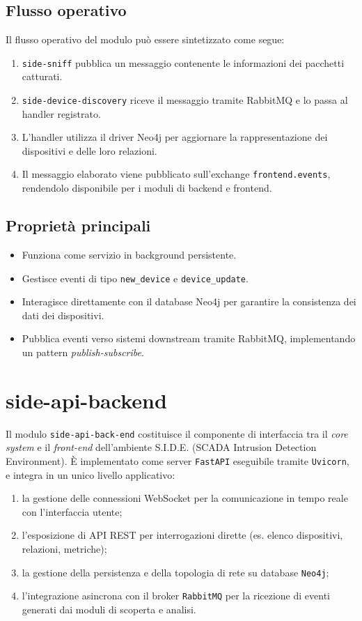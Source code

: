 \subsection{Flusso operativo}

Il flusso operativo del modulo può essere sintetizzato come segue:

\begin{enumerate}
    \item \texttt{side-sniff} pubblica un messaggio contenente le informazioni dei pacchetti catturati.
    \item \texttt{side-device-discovery} riceve il messaggio tramite RabbitMQ e lo passa al handler registrato.
    \item L'handler utilizza il driver Neo4j per aggiornare la rappresentazione dei dispositivi e delle loro relazioni.
    \item Il messaggio elaborato viene pubblicato sull'exchange \texttt{frontend.events}, rendendolo disponibile per i moduli di backend e frontend.
\end{enumerate}

\subsection{Proprietà principali}

\begin{itemize}
    \item Funziona come servizio in background persistente.
    \item Gestisce eventi di tipo \texttt{new\_device} e \texttt{device\_update}.
    \item Interagisce direttamente con il database Neo4j per garantire la consistenza dei dati dei dispositivi.
    \item Pubblica eventi verso sistemi downstream tramite RabbitMQ, implementando un pattern \textit{publish-subscribe}.
\end{itemize}


\section{side-api-backend}

Il modulo \texttt{side-api-back-end} costituisce il componente di interfaccia tra il \textit{core system} e il \textit{front-end} dell’ambiente S.I.D.E. (SCADA Intrusion Detection Environment).  
È implementato come server \texttt{FastAPI} eseguibile tramite \texttt{Uvicorn}, e integra in un unico livello applicativo:
\begin{enumerate}
  \item la gestione delle connessioni WebSocket per la comunicazione in tempo reale con l’interfaccia utente;
  \item l’esposizione di API REST per interrogazioni dirette (es. elenco dispositivi, relazioni, metriche);
  \item la gestione della persistenza e della topologia di rete su database \texttt{Neo4j};
  \item l’integrazione asincrona con il broker \texttt{RabbitMQ} per la ricezione di eventi generati dai moduli di scoperta e analisi.
\end{enumerate}

